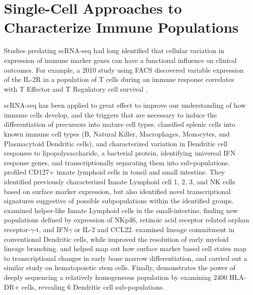 \section{Single-Cell Approaches to Characterize Immune Populations}

Studies predating scRNA-seq had long identified that cellular variation in expression of immune marker genes can have a functional influence on clinical outcomes. 
For example, a 2010 study using FACS discovered variable expression of the IL-2R in a population of T cells during an immune response correlates with T Effector and T Regulatory cell survival \citep{Feinerman2010}.

scRNA-seq has been applied to great effect to improve our understanding of how immune cells develop, and the triggers that are necessary to induce the differentiation of precursors into mature cell types. 
\cite{Jaitin2014} classified splenic cells into known immune cell types (B, Natural Killer, Macrophages, Monocytes, and Plasmacytoid Dendritic cells), 
and characterized variation in Dendritic cell responses to lipopolysaccharide, a bacterial protein, identifying universal IFN response genes, and transcriptionally separating them into sub-populations. 
\cite{Bjoerklund2016} profiled CD127+ innate lymphoid cells in tonsil and small intestine. 
They identified previously characterized Innate Lymphoid cell 1, 2, 3, and NK cells based on surface marker expression, but also identified novel transcriptional signatures suggestive of possible subpopulations within the identified groups.  
\cite{Gury-BenAri2016} examined helper-like Innate Lymphoid cells in the small-intestine, finding new populations defined by expression of NKp46, retinoic acid receptor related orphan receptor-$\gamma$-t, and IFN$\gamma$ or IL-2 and CCL22. 
\cite{Schlitzer2015} examined lineage commitment in conventional Dendritic cells, while \cite{Drissen2016} improved the resolution of early myeloid lineage branching.
\cite{Loennberg2017} and \cite{Paul2015} helped map out how surface marker based cell states map to transcriptional changes in early bone marrow differentiation, and \cite{Nestorowa2016} carried out a similar study on hematopoietic stem cells.
Finally, \cite{Villani2017} demonstrates the power of deeply sequencing a relatively homogeneous population by examining 2400 HLA-DR+ cells, revealing 6 Dendritic cell sub-populations.

